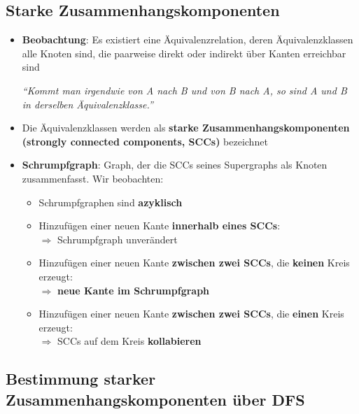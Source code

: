 \documentclass[10pt,a4paper]{article}
\newcommand{\quotestyle}[1]{\enquote{#1}}
\begin{document}
	\subsection{Starke Zusammenhangskomponenten}
	\label{dfs:sub:starke_zusammenhangskomponenten}
	
	\begin{itemize}
		\item \textbf{Beobachtung}: Es existiert eine Äquivalenzrelation, deren Äquivalenzklassen alle Knoten sind, die paarweise direkt oder indirekt über Kanten erreichbar sind
		\begin{center}
			\textit{\quotestyle{Kommt man irgendwie von A nach B und von B nach A, so sind A und B in derselben Äquivalenzklasse.}}
		\end{center}
		\item Die Äquivalenzklassen werden als \textbf{starke Zusammenhangskomponenten (strongly connected components, SCCs)} bezeichnet
		\item \textbf{Schrumpfgraph}: Graph, der die SCCs seines Supergraphs als Knoten zusammenfasst. Wir beobachten:
		\begin{itemize}
			\item Schrumpfgraphen sind \textbf{azyklisch}
			\item Hinzufügen einer neuen Kante \textbf{innerhalb eines SCCs}:\\$\Rightarrow$ Schrumpfgraph unverändert
			\item Hinzufügen einer neuen Kante \textbf{zwischen zwei SCCs}, die \textbf{keinen} Kreis erzeugt:\\$\Rightarrow$ \textbf{neue Kante im Schrumpfgraph}
			\item Hinzufügen einer neuen Kante \textbf{zwischen zwei SCCs}, die \textbf{einen} Kreis erzeugt:\\$\Rightarrow$ SCCs auf dem Kreis \textbf{kollabieren}
		\end{itemize}
	\end{itemize}
	
	\subsection{Bestimmung starker Zusammenhangskomponenten über DFS}
	\label{dfs:sub:bestimmung_starker_zusammenhangskomponenten_ueber_dfs}
	
\end{document}
